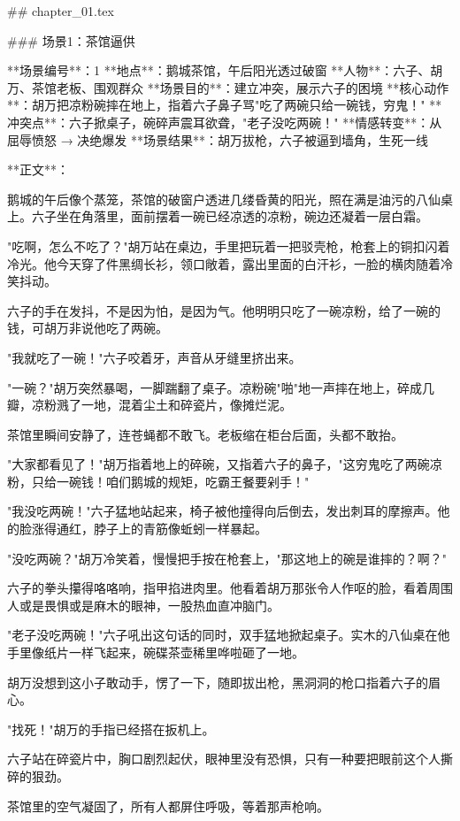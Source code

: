 ## chapter_01.tex

### 场景1：茶馆逼供

**场景编号**：1  
**地点**：鹅城茶馆，午后阳光透过破窗  
**人物**：六子、胡万、茶馆老板、围观群众  
**场景目的**：建立冲突，展示六子的困境  
**核心动作**：胡万把凉粉碗摔在地上，指着六子鼻子骂"吃了两碗只给一碗钱，穷鬼！"  
**冲突点**：六子掀桌子，碗碎声震耳欲聋，"老子没吃两碗！"  
**情感转变**：从屈辱愤怒 → 决绝爆发  
**场景结果**：胡万拔枪，六子被逼到墙角，生死一线

**正文**：

鹅城的午后像个蒸笼，茶馆的破窗户透进几缕昏黄的阳光，照在满是油污的八仙桌上。六子坐在角落里，面前摆着一碗已经凉透的凉粉，碗边还凝着一层白霜。

"吃啊，怎么不吃了？"胡万站在桌边，手里把玩着一把驳壳枪，枪套上的铜扣闪着冷光。他今天穿了件黑绸长衫，领口敞着，露出里面的白汗衫，一脸的横肉随着冷笑抖动。

六子的手在发抖，不是因为怕，是因为气。他明明只吃了一碗凉粉，给了一碗的钱，可胡万非说他吃了两碗。

"我就吃了一碗！"六子咬着牙，声音从牙缝里挤出来。

"一碗？"胡万突然暴喝，一脚踹翻了桌子。凉粉碗"啪"地一声摔在地上，碎成几瓣，凉粉溅了一地，混着尘土和碎瓷片，像摊烂泥。

茶馆里瞬间安静了，连苍蝇都不敢飞。老板缩在柜台后面，头都不敢抬。

"大家都看见了！"胡万指着地上的碎碗，又指着六子的鼻子，"这穷鬼吃了两碗凉粉，只给一碗钱！咱们鹅城的规矩，吃霸王餐要剁手！"

"我没吃两碗！"六子猛地站起来，椅子被他撞得向后倒去，发出刺耳的摩擦声。他的脸涨得通红，脖子上的青筋像蚯蚓一样暴起。

"没吃两碗？"胡万冷笑着，慢慢把手按在枪套上，"那这地上的碗是谁摔的？啊？"

六子的拳头攥得咯咯响，指甲掐进肉里。他看着胡万那张令人作呕的脸，看着周围人或是畏惧或是麻木的眼神，一股热血直冲脑门。

"老子没吃两碗！"六子吼出这句话的同时，双手猛地掀起桌子。实木的八仙桌在他手里像纸片一样飞起来，碗碟茶壶稀里哗啦砸了一地。

胡万没想到这小子敢动手，愣了一下，随即拔出枪，黑洞洞的枪口指着六子的眉心。

"找死！"胡万的手指已经搭在扳机上。

六子站在碎瓷片中，胸口剧烈起伏，眼神里没有恐惧，只有一种要把眼前这个人撕碎的狠劲。

茶馆里的空气凝固了，所有人都屏住呼吸，等着那声枪响。

